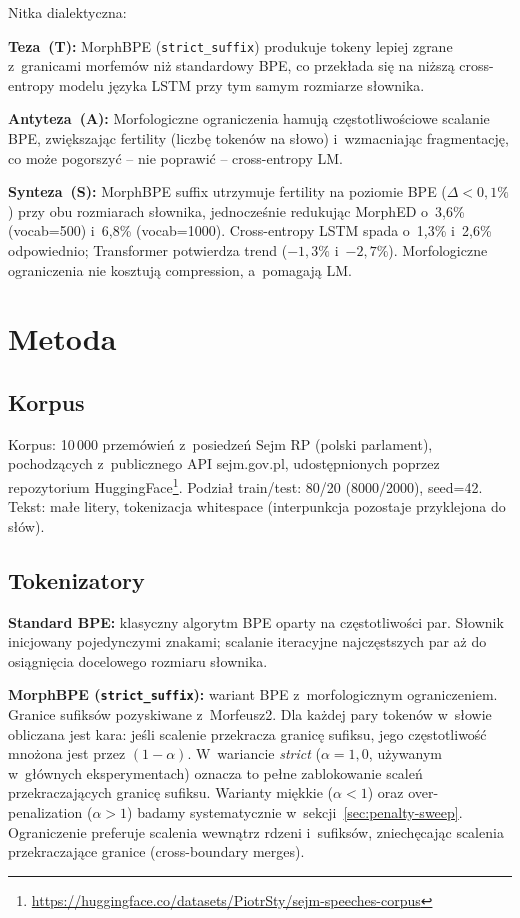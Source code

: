 \smallskip
\noindent
Nitka dialektyczna:

\medskip
\noindent
\textbf{Teza~(T):} MorphBPE (\texttt{strict\_suffix}) produkuje tokeny
lepiej zgrane z~granicami morfemów niż standardowy BPE, co przekłada
się na niższą cross-entropy modelu języka LSTM przy tym samym
rozmiarze słownika.

\medskip
\noindent
\textbf{Antyteza~(A):} Morfologiczne ograniczenia hamują częstotliwościowe
scalanie BPE, zwiększając fertility (liczbę tokenów na słowo)
i~wzmacniając fragmentację, co może pogorszyć -- nie poprawić --
cross-entropy LM.

\begin{slayerinsight}
\textbf{Synteza~(S):} MorphBPE suffix utrzymuje fertility na poziomie
BPE ($\Delta < 0{,}1\%$) przy obu rozmiarach słownika, jednocześnie
redukując MorphED o~3{,}6\% (vocab=500) i~6{,}8\% (vocab=1000).
Cross-entropy LSTM spada o~1{,}3\% i~2{,}6\% odpowiednio;
Transformer potwierdza trend ($-1{,}3\%$ i~$-2{,}7\%$).
Morfologiczne ograniczenia nie kosztują compression, a~pomagają LM.
\end{slayerinsight}

\section{Metoda}

\subsection*{Korpus}
Korpus: 10\,000 przemówień z~posiedzeń Sejm RP (polski parlament),
pochodzących z~publicznego API sejm.gov.pl, udostępnionych
poprzez repozytorium HuggingFace\footnote{\url{https://huggingface.co/datasets/PiotrSty/sejm-speeches-corpus}}.
Podział train/test: 80/20 (8000/2000), seed=42.
Tekst: małe litery, tokenizacja whitespace (interpunkcja
pozostaje przyklejona do słów).

\subsection*{Tokenizatory}
\textbf{Standard BPE:} klasyczny algorytm BPE oparty na częstotliwości
par. Słownik inicjowany pojedynczymi znakami; scalanie iteracyjne
najczęstszych par aż do osiągnięcia docelowego rozmiaru słownika.

\smallskip
\noindent
\textbf{MorphBPE (\texttt{strict\_suffix}):} wariant BPE z~morfologicznym
ograniczeniem. Granice sufiksów pozyskiwane z~Morfeusz2.
Dla każdej pary tokenów w~słowie obliczana jest kara:
jeśli scalenie przekracza granicę sufiksu, jego częstotliwość
mnożona jest przez $(1 - \alpha)$. W~wariancie \emph{strict}
($\alpha = 1{,}0$, używanym w~głównych eksperymentach) oznacza to
pełne zablokowanie scaleń przekraczających granicę sufiksu.
Warianty miękkie ($\alpha < 1$) oraz over-penalization ($\alpha > 1$)
badamy systematycznie w~sekcji~\ref{sec:penalty-sweep}.
Ograniczenie preferuje scalenia wewnątrz rdzeni i~sufiksów,
zniechęcając scalenia przekraczające granice (cross-boundary merges).

